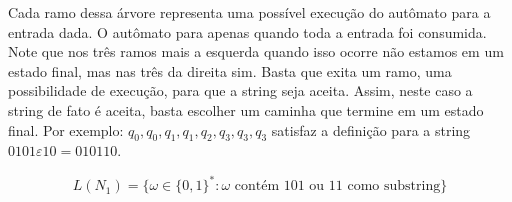 \begin{example}
\begin{center}
\end{center}

Cada ramo dessa árvore representa uma possível execução do autômato para a entrada dada.
O autômato para apenas quando toda a entrada foi consumida.
Note que nos três ramos mais a esquerda quando isso ocorre não estamos em um estado final, mas nas três da direita sim.
Basta que exita um ramo, uma possibilidade de execução, para que a string seja aceita.
Assim, neste caso a string de fato é aceita, basta escolher um caminha que termine em um estado final.
Por exemplo: $q_0, q_0, q_1, q_1, q_2, q_3, q_3, q_3$ satisfaz a definição para a string $0101\varepsilon 10 = 010110$.

\begin{displaymath}
  L(N_1) = \{\omega \in \{0,1\}^* : \omega \textrm{ contém 101 ou 11 como substring}\}
\end{displaymath}
\end{example}


